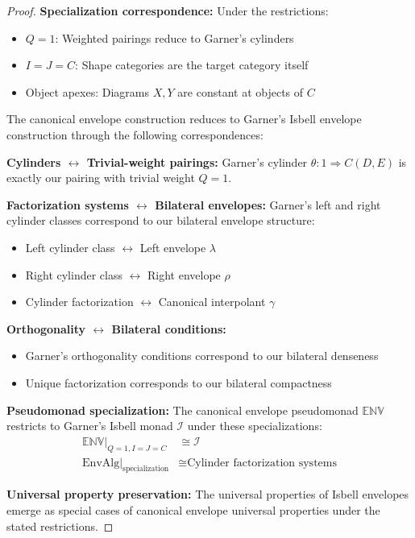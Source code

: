 \documentclass[11pt]{article}
\theoremstyle{plain}
\theoremstyle{definition}
\theoremstyle{remark}
\newcommand{\EnvAlg}{\mathrm{EnvAlg}}
\begin{document}
\begin{proof}
\textbf{Specialization correspondence:} Under the restrictions:
\begin{itemize}
\item $Q = 1$: Weighted pairings reduce to Garner's cylinders
\item $I = J = C$: Shape categories are the target category itself
\item Object apexes: Diagrams $X, Y$ are constant at objects of $C$
\end{itemize}

The canonical envelope construction reduces to Garner's Isbell envelope construction through the following correspondences:

\textbf{Cylinders $\leftrightarrow$ Trivial-weight pairings:} Garner's cylinder $\theta : 1 \Rightarrow C(D, E)$ is exactly our pairing with trivial weight $Q = 1$.

\textbf{Factorization systems $\leftrightarrow$ Bilateral envelopes:} Garner's left and right cylinder classes correspond to our bilateral envelope structure:
\begin{itemize}
\item Left cylinder class $\leftrightarrow$ Left envelope $\lambda$
\item Right cylinder class $\leftrightarrow$ Right envelope $\rho$  
\item Cylinder factorization $\leftrightarrow$ Canonical interpolant $\gamma$
\end{itemize}

\textbf{Orthogonality $\leftrightarrow$ Bilateral conditions:}
\begin{itemize}
\item Garner's orthogonality conditions correspond to our bilateral denseness
\item Unique factorization corresponds to our bilateral compactness
\end{itemize}

\textbf{Pseudomonad specialization:} The canonical envelope pseudomonad $\mathbb{ENV}$ restricts to Garner's Isbell monad $\mathcal{I}$ under these specializations:
\begin{align}
\mathbb{ENV}|_{Q=1,I=J=C} &\cong \mathcal{I} \\
\EnvAlg|_{\text{specialization}} &\cong \text{Cylinder factorization systems}
\end{align}

\textbf{Universal property preservation:} The universal properties of Isbell envelopes emerge as special cases of canonical envelope universal properties under the stated restrictions.
\end{proof}
\end{document}

